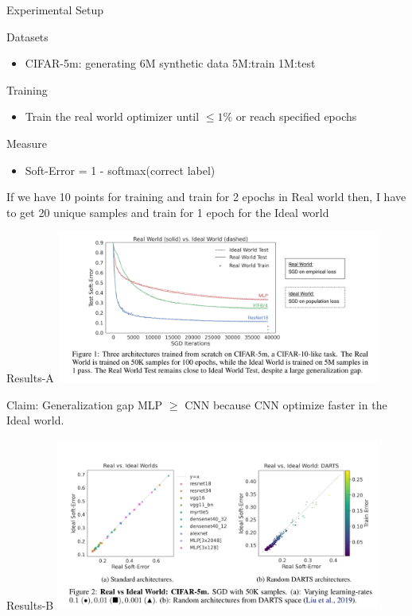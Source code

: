 \documentclass[aspectratio=169]{beamer}
\begin{document}
\begin{frame}{Experimental Setup}
\begin{block}{\color{White} Datasets}
	\begin{itemize}
		\item CIFAR-5m: generating 6M synthetic data 5M:train 1M:test
	\end{itemize}	
\end{block}
\begin{block}{\color{White} Training}
	\begin{itemize}
		\item Train the real world optimizer until $\leq1\%$ or reach specified epochs
	\end{itemize}	
\end{block}
\begin{block}{\color{White} Measure}
	\begin{itemize}
		\item Soft-Error = 1 - softmax(correct label)
	\end{itemize}	
\end{block}

\centering
\color{Pink} If we have 10 points for training and train for 2 epochs in Real world then, I have to get 20 unique samples and train for 1 epoch for the Ideal world
\end{frame}

\begin{frame}{Results-A}
	\centering
	\includegraphics[width=0.8\textwidth]{Figures/1}
		
	\color{Pink} Claim: \color{Black} Generalization gap MLP $\geq$ CNN because CNN optimize faster in the Ideal world.
\end{frame}

\begin{frame}{Results-B}
	\centering
	\includegraphics[width=0.8\textwidth]{Figures/2}	
\end{frame}
\end{document}
